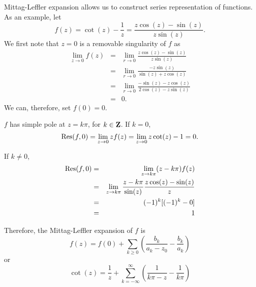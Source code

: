 Mittag-Leffler expansion allows us to construct series representation of functions.
As an example, let
\[
f(z) = \cot(z) - \frac{1}{z} = \frac{z\cos(z) - \sin(z)}{z\sin(z)}.
\]
We first note that $z = 0$ is a removable singularity of $f$ as
\begin{eqnarray*}
\lim_{z \rightarrow 0}f(z) 
 &=& \lim_{r \rightarrow 0}\frac{z\cos(z) - \sin(z)}{z\sin(z)} \\
 &=& \lim_{r \rightarrow 0}\frac{- z\sin(z)}{\sin(z) + z\cos(z)} \\
 &=& \lim_{r \rightarrow 0}\frac{-\sin(z) - z\cos(z)}{2\cos(z) - z\sin(z)} \\
 &=& 0.
\end{eqnarray*}
We can, therefore, set $f(0) = 0$.

$f$ has simple pole at $z = k\pi$, for $k \in \mathbf{Z}$. If $k = 0$,
\[
\operatorname{Res}(f, 0) = \lim_{z \rightarrow 0} zf(z) = \lim_{z \rightarrow 0} z\cot(z) - 1 = 0.
\]

If $k \ne 0$,
\begin{eqnarray*}
\operatorname{Res}(f, 0) &=& \lim_{z \rightarrow k\pi}(z - k\pi)f(z) \\
 &=& \lim_{z \rightarrow k\pi}\frac{z - k\pi}{\sin(z)}\frac{z\cos(z) - \sin(z)}{z} \\
 &=& (-1)^k[(-1)^k - 0] \\
 &=& 1
\end{eqnarray*}

Therefore, the Mittag-Leffler expansion of $f$ is
\[
f(z) = f(0) + \sum_{k \ge 0}\left(\frac{b_k}{a_k - z_0} - \frac{b_k}{a_k}\right)
\]
or
\[
\cot(z) = \frac{1}{z} + \sum_{k = -\infty}^\infty\left(\frac{1}{k\pi - z} - \frac{1}{k\pi}\right)
\]

